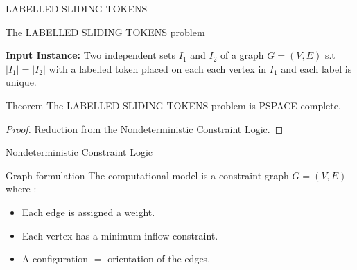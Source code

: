 \begin{frame}{LABELLED SLIDING TOKENS}
    \begin{block}{The LABELLED SLIDING TOKENS problem}
        \begin{flushleft}
          \textbf{Input Instance: } Two independent sets $I_1$ and $I_2$ of a graph $G = (V,E)$ s.t $|I_1| = |I_2|$ with a labelled token placed on each each vertex in $I_1$ and each label is unique. \\
        \end{flushleft}
    \end{block}    
    
    \begin{block}{Theorem} The LABELLED SLIDING TOKENS problem is PSPACE-complete. 
   \end{block}
   
   \begin{proof} Reduction from the Nondeterministic Constraint Logic.
   \end{proof}
\end{frame}

\begin{frame}{Nondeterministic Constraint Logic}
    \begin{block}{Graph formulation}
    The computational model is a constraint graph $G = (V,E)$ \\ where :
     \begin{itemize}
        \item Each edge is assigned a weight. 
        \item Each vertex has a minimum inflow constraint.
        \item A configuration $=$ orientation of the edges. 
    \end{itemize}
    \end{block}
\end{frame}

